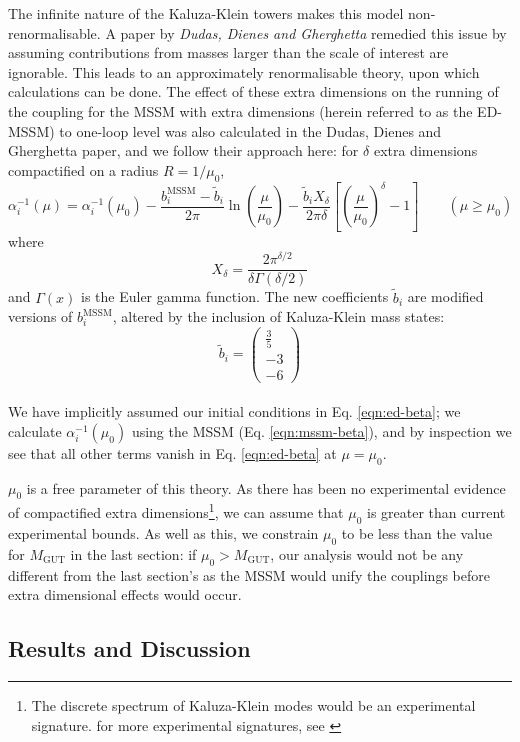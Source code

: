\documentclass[12pt,a4paper,oneside]{article}
\begin{document}
The infinite nature of the Kaluza-Klein towers makes this model non-renormalisable. A paper by \textit{Dudas, Dienes and Gherghetta} \cite{gherghetta} remedied this issue by assuming contributions from masses larger than the scale of interest are ignorable. This leads to an approximately renormalisable theory, upon which calculations can be done. The effect of these extra dimensions on the running of the coupling for the MSSM with extra dimensions (herein referred to as the ED-MSSM) to one-loop level was also calculated in the Dudas, Dienes and Gherghetta paper, and we follow their approach here: for $\delta$ extra dimensions compactified on a radius $R = 1 / \mu_0$,
\begin{equation}
\alpha_i^{-1} (\mu) = \alpha_i^{-1} (\mu_0) - \frac{b_i^\mathrm{MSSM} - \tilde{b}_i}{2 \pi} \ln \left( \frac{\mu}{\mu_0} \right) - \frac{\tilde{b}_i X_\delta}{2 \pi \delta} \left[ \left( \frac{\mu}{\mu_0} \right)^\delta - 1 \right] \quad\quad (\mu \geq \mu_0)
\label{eqn:ed-beta}
\end{equation}
where
\[
X_\delta = \frac{2 \pi^{\delta / 2}}{\delta \Gamma(\delta/2)}
\]
and $\Gamma(x)$ is the Euler gamma function. The new coefficients $\tilde{b}_i$ are modified versions of $b_i^\mathrm{MSSM}$, altered by the inclusion of Kaluza-Klein mass states:
\singlespace
\[
\tilde{b}_i = \begin{pmatrix} \frac{3}{5} \\ -3 \\ -6 \end{pmatrix}
\]
\\
\doublespace
We have implicitly assumed our initial conditions in Eq. \ref{eqn:ed-beta}; we calculate $\alpha_i^{-1} (\mu_0)$ using the MSSM (Eq. \ref{eqn:mssm-beta}), and by inspection we see that all other terms vanish in Eq. \ref{eqn:ed-beta} at $\mu=\mu_0$.

$\mu_0$ is a free parameter of this theory. As there has been no experimental evidence of compactified extra dimensions\footnote{The discrete spectrum of Kaluza-Klein modes would be an experimental signature. for more experimental signatures, see \cite{kk-exp}}, we can assume that $\mu_0$ is greater than current experimental bounds. As well as this, we constrain $\mu_0$ to be less than the value for $M_\mathrm{GUT}$ in the last section: if $\mu_0 > M_\mathrm{GUT}$, our analysis would not be any different from the last section's as the MSSM would unify the couplings before extra dimensional effects would occur.

\subsection{Results and Discussion}
\end{document}
